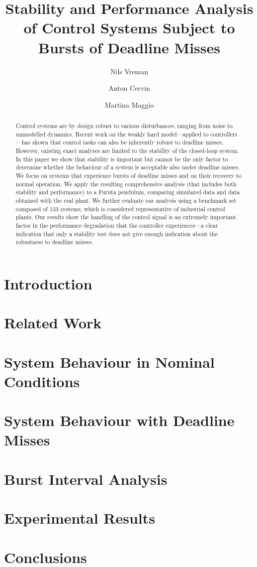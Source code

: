 \documentclass[a4paper,UKenglish,cleveref, autoref, thm-restate]{lipics-v2021}
\title{Stability and Performance Analysis of Control Systems Subject to Bursts of Deadline Misses}
\author{Nils Vreman}{Lund University, Department of Automatic Control, Sweden}{nils.vreman@control.lth.se}{https://orcid.org/0000-0002-6732-9500}{}
\author{Anton Cervin}{Lund University, Department of Automatic Control, Sweden}{anton.cervin@control.lth.se}{https://orcid.org/0000-0003-4889-8772}{}
\author{Martina Maggio}{Saarland University, Department of Computer Science, Germany \and Lund University, Department of Automatic Control, Sweden}{maggio@cs.uni-saarland.de}{https://orcid.org/0000-0002-1143-1127}{}
\begin{document}
\maketitle

\begin{abstract}
Control systems are by design robust to various disturbances, ranging from noise to unmodelled dynamics. 
Recent work on the weakly hard model---applied to controllers---has shown that control tasks can also be inherently robust to deadline misses. 
However, existing exact analyses are limited to the stability of the closed-loop system. 
In this paper we show that stability is important but cannot be the only factor to determine whether the behaviour of a system is acceptable also under deadline misses. 
We focus on systems that experience bursts of deadline misses and on their recovery to normal operation. 
We apply the resulting comprehensive analysis (that includes both stability and performance) to a Furuta pendulum, comparing simulated data and data obtained with the real plant. 
We further evaluate our analysis using a benchmark set composed of 133 systems, which is considered representative of industrial control plants. 
Our results show the handling of the control signal is an extremely important factor in the performance degradation that the controller experiences---a clear indication that only a stability test does not give enough indication about the robustness to deadline misses.
\end{abstract}

\section{Introduction}
\label{sec:intro}


\section{Related Work}
\label{sec:related}


\section{System Behaviour in Nominal Conditions}
\label{sec:model}


\section{System Behaviour with Deadline Misses}
\label{sec:deadline}


\section{Burst Interval Analysis}
\label{sec:analysis}


\section{Experimental Results}
\label{sec:results}


\section{Conclusions}
\label{sec:conc}


%

\end{document}
